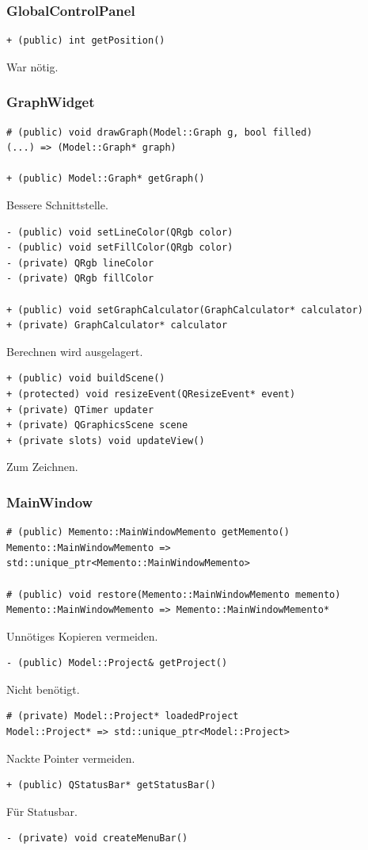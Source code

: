 \documentclass{scrartcl}
\begin{document}
{\subsubsection{GlobalControlPanel}
\begin{verbatim}
+ (public) int getPosition()
\end{verbatim}
War nötig.
\newpage
\subsubsection{GraphWidget}
\bigskip
\begin{verbatim}
# (public) void drawGraph(Model::Graph g, bool filled)
(...) => (Model::Graph* graph)

+ (public) Model::Graph* getGraph()
\end{verbatim}
Bessere Schnittstelle.
\bigskip
\begin{verbatim}
- (public) void setLineColor(QRgb color)
- (public) void setFillColor(QRgb color)
- (private) QRgb lineColor
- (private) QRgb fillColor

+ (public) void setGraphCalculator(GraphCalculator* calculator)
+ (private) GraphCalculator* calculator
\end{verbatim}
Berechnen wird ausgelagert.
\bigskip
\begin{verbatim}
+ (public) void buildScene()
+ (protected) void resizeEvent(QResizeEvent* event)
+ (private) QTimer updater
+ (private) QGraphicsScene scene
+ (private slots) void updateView()
\end{verbatim}
Zum Zeichnen.
\newpage
\subsubsection{MainWindow}
\bigskip
\begin{verbatim}
# (public) Memento::MainWindowMemento getMemento()
Memento::MainWindowMemento => std::unique_ptr<Memento::MainWindowMemento>

# (public) void restore(Memento::MainWindowMemento memento)
Memento::MainWindowMemento => Memento::MainWindowMemento*
\end{verbatim}
Unnötiges Kopieren vermeiden.
\bigskip
\begin{verbatim}
- (public) Model::Project& getProject()
\end{verbatim}
Nicht benötigt.
\bigskip
\begin{verbatim}
# (private) Model::Project* loadedProject
Model::Project* => std::unique_ptr<Model::Project>
\end{verbatim}
Nackte Pointer vermeiden.
\bigskip
\begin{verbatim}
+ (public) QStatusBar* getStatusBar()
\end{verbatim}
Für Statusbar.
\bigskip
\begin{verbatim}
- (private) void createMenuBar()


\end{verbatim}}
\end{document}
